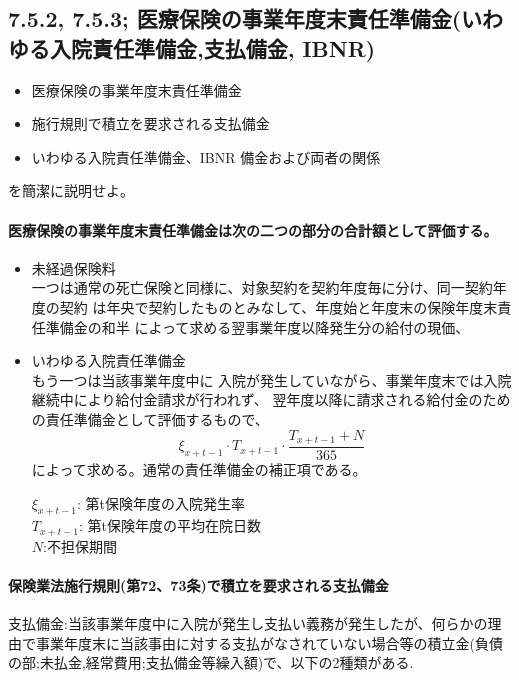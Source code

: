 \documentclass[report,gutter=10mm,fore-edge=10mm,uplatex,dvipdfmx]{jlreq}
\begin{document}
\subsection{7.5.2, 7.5.3; 医療保険の事業年度末責任準備金(いわゆる入院責任準備金,支払備金, IBNR)}

\begin{itemize}
\item  医療保険の事業年度末責任準備金
\item  施行規則で積立を要求される支払備金
\item  いわゆる入院責任準備金、IBNR 備金および両者の関係
\end{itemize}

を簡潔に説明せよ。


\paragraph{医療保険の事業年度末責任準備金は次の二つの部分の合計額として評価する。}

\begin{itemize}
 \item 未経過保険料\\
一つは通常の死亡保険と同様に、対象契約を契約年度毎に分け、同一契約年度の契約
は年央で契約したものとみなして、年度始と年度末の保険年度末責任準備金の和半
によって求める翌事業年度以降発生分の給付の現価、
 \item いわゆる入院責任準備金\\
もう一つは当該事業年度中に
入院が発生していながら、事業年度末では入院継続中により給付金請求が行われず、
翌年度以降に請求される給付金のための責任準備金として評価するもので、
$$\xi_{x+t-1}\cdot T_{x+t-1}\cdot\frac{T_{x+t-1}+N}{365}$$
によって求める。通常の責任準備金の補正項である。

$\xi_{x+t-1}$: 第t保険年度の入院発生率\\
$T_{x+t-1}$: 第t保険年度の平均在院日数\\
$N$:不担保期間
\end{itemize}

\paragraph{保険業法施行規則(第72、73条)で積立を要求される支払備金}

支払備金:当該事業年度中に入院が発生し支払い義務が発生したが、何らかの理由で事業年度末に当該事由に対する支払がなされていない場合等の積立金(負債の部;未払金,経常費用;支払備金等繰入額)で、以下の2種類がある. 
\end{document}

